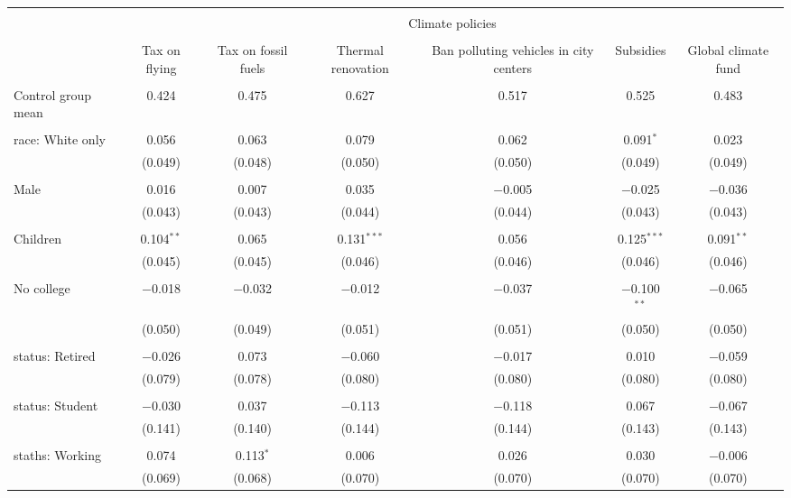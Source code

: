 
\begin{tabular}{@{\extracolsep{5pt}}lcccccc} 
\\[-1.8ex]\hline 
\hline \\[-1.8ex] 
 & \multicolumn{6}{c}{Climate policies} \\ 
\cline{2-7} 
\\[-1.8ex] & Tax on flying & Tax on fossil fuels & Thermal renovation & Ban polluting vehicles in city centers & Subsidies & Global climate fund \\ 
\hline \\[-1.8ex] 
 Control group mean & 0.424 & 0.475 & 0.627 & 0.517 & 0.525 & 0.483  \\ \hline \\[-1.8ex] race: White only & 0.056 & 0.063 & 0.079 & 0.062 & 0.091$^{*}$ & 0.023 \\ 
  & (0.049) & (0.048) & (0.050) & (0.050) & (0.049) & (0.049) \\ 
  & & & & & & \\ 
 Male & 0.016 & 0.007 & 0.035 & $-$0.005 & $-$0.025 & $-$0.036 \\ 
  & (0.043) & (0.043) & (0.044) & (0.044) & (0.043) & (0.043) \\ 
  & & & & & & \\ 
 Children & 0.104$^{**}$ & 0.065 & 0.131$^{***}$ & 0.056 & 0.125$^{***}$ & 0.091$^{**}$ \\ 
  & (0.045) & (0.045) & (0.046) & (0.046) & (0.046) & (0.046) \\ 
  & & & & & & \\ 
 No college & $-$0.018 & $-$0.032 & $-$0.012 & $-$0.037 & $-$0.100$^{**}$ & $-$0.065 \\ 
  & (0.050) & (0.049) & (0.051) & (0.051) & (0.050) & (0.050) \\ 
  & & & & & & \\ 
 status: Retired & $-$0.026 & 0.073 & $-$0.060 & $-$0.017 & 0.010 & $-$0.059 \\ 
  & (0.079) & (0.078) & (0.080) & (0.080) & (0.080) & (0.080) \\ 
  & & & & & & \\ 
 status: Student & $-$0.030 & 0.037 & $-$0.113 & $-$0.118 & 0.067 & $-$0.067 \\ 
  & (0.141) & (0.140) & (0.144) & (0.144) & (0.143) & (0.143) \\ 
  & & & & & & \\ 
 staths: Working & 0.074 & 0.113$^{*}$ & 0.006 & 0.026 & 0.030 & $-$0.006 \\ 
  & (0.069) & (0.068) & (0.070) & (0.070) & (0.070) & (0.070) \\ 

\end{tabular}
